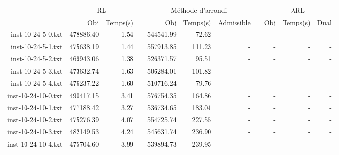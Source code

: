 \begin{landscape}
\begin{table}[h!]
\begin{tabular}{@{}rrrcrrrcrrr@{}}
\end{tabular}
\end{table}
\end{landscape}
\newpage

\begin{landscape}

\begin{table}[h!]\centering
{}
\begin{tabular}{@{}rrrcrrrcrrr@{}}\toprule
& \multicolumn{2}{c}{RL} & \phantom{abc} & \multicolumn{3}{c}{Méthode d'arrondi} & \phantom{abc} & \multicolumn{3}{c}{$\lambda$RL}\\
\cmidrule{2-3} \cmidrule{5-7} \cmidrule{9-11}
& Obj & Temps(s) & & Obj & Temps(s) & Admissible & & Obj & Temps(s) & Dual\\ \midrule

inst-10-24-5-0.txt & 478886.40 & 1.54 & & 544541.99 & 72.62 & - & & - & - & - \\
inst-10-24-5-1.txt & 475638.19 & 1.44 & & 557913.85 & 111.23 & - & & - & - & - \\
inst-10-24-5-2.txt & 469943.06 & 1.38 & & 526371.57 & 95.51 & - & & - & - & - \\
inst-10-24-5-3.txt & 473632.74 & 1.63 & & 506284.01 & 101.82 & - & & - & - & - \\
inst-10-24-5-4.txt & 476237.22 & 1.60 & & 510716.24 & 79.76 & - & & - & - & - \\
inst-10-24-10-0.txt & 490417.15 & 3.41 & & 576754.35 & 164.86 & - & & - & - & - \\
inst-10-24-10-1.txt & 477188.42 & 3.27 & & 536734.65 & 183.04 & - & & - & - & - \\
inst-10-24-10-2.txt & 475276.39 & 4.07 & & 554725.74 & 227.55 & - & & - & - & - \\
inst-10-24-10-3.txt & 482149.53 & 4.24 & & 545631.74 & 236.90 & - & & - & - & - \\
inst-10-24-10-4.txt & 475704.60 & 3.99 & & 539894.73 & 239.95 & - & & - & - & - \\

\end{tabular}
\end{table}

\end{landscape}